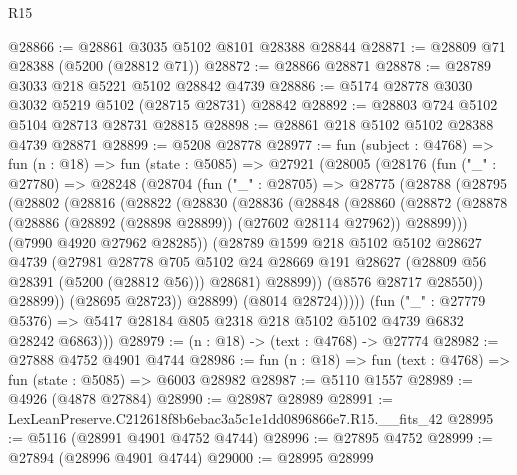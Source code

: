 \begin{lexlean}{R15}
\begin{coremodule}
{{{{{{{{{{{@28866 := @28861 @3035 @5102 @8101 @28388 @28844
@28871 := @28809 @71 @28388 (@5200 (@28812 @71))
@28872 := @28866 @28871
@28878 := @28789 @3033 @218 @5221 @5102 @28842 @4739
@28886 := @5174 @28778 @3030 @3032 @5219 @5102 (@28715 @28731) @28842
@28892 := @28803 @724 @5102 @5104 @28713 @28731 @28815
@28898 := @28861 @218 @5102 @5102 @28388 @4739 @28871
@28899 := @5208 @28778
@28977 := fun (subject : @4768) =>
  fun (n : @18) =>
  fun (state : @5085) =>
  @27921
    (@28005
      (@28176
        (fun ("_" : @27780) =>
        @28248
          (@28704
            (fun ("_" : @28705) =>
            @28775
              (@28788
                (@28795
                  (@28802
                    (@28816
                      (@28822
                        (@28830
                          (@28836
                            (@28848
                              (@28860
                                (@28872
                                  (@28878
                                    (@28886 (@28892 (@28898 @28899)) (@27602 @28114 @27962))
                                    @28899)))
                              (@7990 @4920 @27962 @28285))
                            (@28789
                              @1599
                              @218
                              @5102
                              @5102
                              @28627
                              @4739
                              (@27981
                                @28778
                                @705
                                @5102
                                @24
                                @28669
                                @191
                                @28627
                                (@28809 @56 @28391 (@5200 (@28812 @56)))
                                @28681)
                              @28899))
                          (@8576 @28717 @28550))
                        @28899))
                    (@28695 @28723))
                  @28899)
                (@8014 @28724)))))
        (fun ("_" : @27779 @5376) =>
        @5417 @28184 @805 @2318 @218 @5102 @5102 @4739 @6832 @28242 @6863)))
@28979 := (n : @18) -> (text : @4768) -> @27774
@28982 := @27888 @4752 @4901 @4744
@28986 := fun (n : @18) => fun (text : @4768) => fun (state : @5085) => @6003 @28982
@28987 := @5110 @1557
@28989 := @4926 (@4878 @27884)
@28990 := @28987 @28989
@28991 := LexLeanPreserve.C212618f8b6ebac3a5c1e1dd0896866e7.R15.__fits_42
@28995 := @5116 (@28991 @4901 @4752 @4744)
@28996 := @27895 @4752
@28999 := @27894 (@28996 @4901 @4744)
@29000 := @28995 @28999
}}}}}}}}}}}
\end{coremodule}
\end{lexlean}

